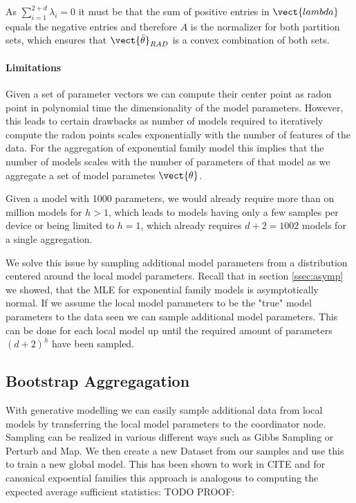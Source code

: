 As $\sum_{i=1}^{2+d} \lambda_i = 0$ it must be that the sum of positive entries in $\vect{lambda}$ equals the negative entries and therefore $A$ is the normalizer for both partition sets, which ensures that $\vect{\bar{\theta}}_{RAD}$ is a convex combination of both sets.

\paragraph*{Limitations}
Given a set of parameter vectors we can compute their center point as radon point in polynomial time \wrt the dimensionality of the model parameters.
However, this leads to certain drawbacks as number of models required to iteratively compute the radon points scales exponentially with the number of features of the data.
For the aggregation of exponential family model this implies that the number of models scales with the number of parameters of that model as we aggregate a set of model parametes $\vect{\theta}$.

Given a model with 1000 parameters, we would already require more than on million models for $h > 1$, which leads to models having only a few samples per device or being limited to $h=1$, which already requires $d+2 = 1002$ models for a single aggregation.

We solve this issue by sampling additional model parameters from a distribution centered around the local model parameters. 
Recall that in section \ref{ssec:asymp} we showed, that the MLE for exponential family 
models is asymptotically normal.
If we assume the local model parameters to be the "true" model parameters \wrt to the data seen we can sample additional model parameters. 
This can be done for each local model up until the required amount of parameters $(d+2)^h$ have been sampled.


\subsection{Bootstrap Aggregagation}

With generative modelling we can easily sample additional data from local models by transferring the local model parameters to the coordinator node.
Sampling can be realized in various different ways such as Gibbs Sampling or Perturb and Map.
We then create a new Dataset from our samples and use this to train a new global model. 
This has been shown to work in CITE and for canonical expoential families this approach is analogous to computing the expected average sufficient statistics:
TODO PROOF:


